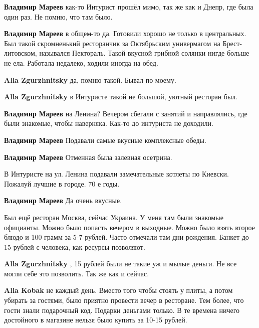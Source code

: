 \begin{itemize}
\begin{itemize}
\begin{itemize}
\textbf{Владимир Мареев} как-то Интурист прошёл мимо, так же как и Днепр, где была один раз. Не помню, что там было.

\textbf{Владимир Мареев} в общем-то да. Готовили хорошо не только в центральных. Был такой скромненький ресторанчик за Октябрьским универмагом на Брест-литовском, назывался Пектораль. Такой вкусной грибной солянки нигде больше не ела. Работала недалеко, ходили иногда на обед.

\textbf{Alla Zgurzhnitsky} да, помню такой. Бывал по моему.

\textbf{Alla Zgurzhnitsky} в Интуристе такой не большой, уютный ресторан был.

\textbf{Владимир Мареев} на Ленина? Вечером сбегали с занятий и направлялись, где были знакомые, чтобы наверняка. Как-то до интуриста не доходили.

\textbf{Владимир Мареев} Подавали самые вкусные комплексные обеды.

\textbf{Владимир Мареев} Отменная была залевная осетрина.
\end{itemize} %

\end{itemize} %


В Интуристе на ул. Ленина подавали замечательные котлеты по Киевски. Пожалуй
лучшие в городе. 70 е годы.

\textbf{Владимир Мареев} Да очень вкусные.


Был ещё ресторан Москва, сейчас Украина. У меня там были знакомые официанты.
Можно было попасть вечером в выходные. Можно было взять второе блюдо и 100
грамм за 5-7 рублей. Часто отмечали там дни рождения. Банкет до 15 рублей с
человека, как ресурсы позволяют.

\begin{itemize} %
\textbf{Alla Zgurzhnitsky} , 15 рублей были не такие уж и мылые деньги. Не все могли себе это позволить. Так же как и сейчас.

\textbf{Alla Kobak} не каждый день. Вместо того чтобы стоять у плиты, а потом убирать за гостями, было приятно провести вечер в ресторане. Тем более, что гости знали подарочный код. Подарки деньгами только. В те времена ничего достойного в магазине нельзя было купить за 10-15 рублей.


\end{itemize}
\end{itemize}
